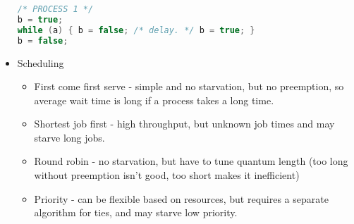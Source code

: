 \begin{itemize}
\begin{lstlisting}[language=c]
/* PROCESS 1 */
b = true;
while (a) { b = false; /* delay. */ b = true; }
b = false;
\end{lstlisting}
    \item Scheduling
    \begin{itemize}
        \item First come first serve - simple and no starvation, but no preemption, so average wait time is long if a process takes a long time.
        \item Shortest job first - high throughput, but unknown job times and may starve long jobs.
        \item Round robin - no starvation, but have to tune quantum length (too long without preemption isn't good, too short makes it inefficient)
        \item Priority - can be flexible based on resources, but requires a separate algorithm for ties, and may starve low priority.
    \end{itemize}
\end{itemize}